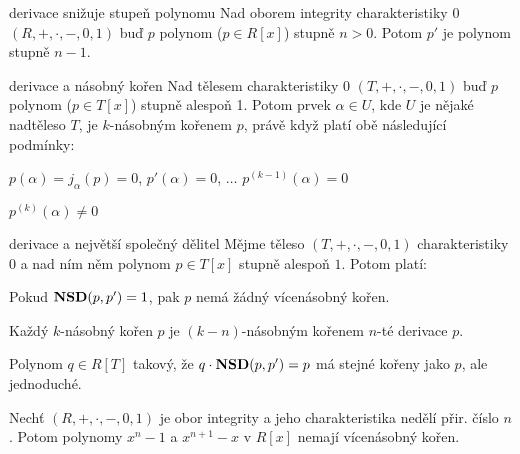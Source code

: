 \begin{vetaN}{derivace snižuje stupeň polynomu}
Nad oborem integrity charakteristiky $0$ $(R,+,\cdot,-,0,1)$ buď $p$ polynom ($p\in R[x]$) stupně $n>0$. Potom $p'$ je polynom stupně $n-1$.
\end{vetaN}

\begin{vetaN}{derivace a násobný kořen}
Nad tělesem charakteristiky $0$ $(T,+,\cdot,-,0,1)$ buď $p$ polynom ($p\in T[x]$) stupně alespoň 1. Potom prvek $\alpha\in U$, kde $U$ je nějaké nadtěleso $T$, je $k$-násobným kořenem $p$, právě když platí obě následující podmínky:
\begin{pitemize}
    \item $p(\alpha)=j_{\alpha}(p)=0$, $p'(\alpha)=0$, $\dots$ $p^{(k-1)}(\alpha)=0$
    \item $p^{(k)}(\alpha)\neq 0$
\end{pitemize}
\end{vetaN}

\begin{vetaN}{derivace a největší společný dělitel}
Mějme těleso $(T,+,\cdot,-,0,1)$ charakteristiky $0$ a nad ním něm polynom $p\in T[x]$ stupně alespoň $1$. Potom platí:
\begin{pitemize}
    \item Pokud $\mathbf{NSD}(p,p')=1$, pak $p$ nemá žádný vícenásobný kořen.
    \item Každý $k$-násobný kořen $p$ je $(k-n)$-násobným kořenem $n$-té derivace $p$.
    \item Polynom $q\in R[T]$ takový, že $q\cdot\mathbf{NSD}(p,p')=p$ má stejné kořeny jako $p$, ale jednoduché.
\end{pitemize}
\end{vetaN}

\begin{veta}
Nechť $(R,+,\cdot,-,0,1)$ je obor integrity a jeho charakteristika nedělí přir. číslo $n$. Potom polynomy $x^n-1$ a $x^{n+1}-x$ v $R[x]$ nemají vícenásobný kořen.
\end{veta}

